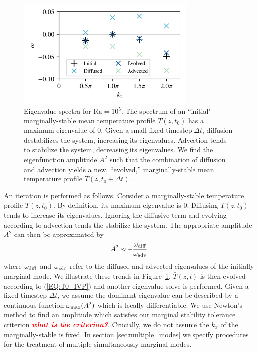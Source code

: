 \documentclass[reprint,amsmath,amssymb,aps]{revtex4-1}
\newcommand{\note}[1]{\noindent \textbf{\textit{\textcolor{Red}{#1}}}}
\newcommand\Ra{\mathrm{Ra}}
\newcommand{\eq}[1]{(\ref{#1})}
\begin{document}
\begin{figure}
    \includegraphics[width=3.4in]{EV_spectrum_ol.png}
    \caption{Eigenvalue spectra for $\Ra = 10^5$. The spectrum of an ``initial" marginally-stable mean temperature profile $\bar{T}(z, t_0)$ has a maximum eigenvalue of 0. 
    Given a small fixed timestep $\Delta t$, diffusion destabilizes the system, increasing its eigenvalues. 
    Advection tends to stabilize the system, decreasing its eigenvalues. 
    We find the eigenfunction amplitude $A^2$ such that the combination of diffusion and advection yields a new, ``evolved,'' marginally-stable mean temperature profile $\bar{T}(z, t_0 + \Delta t)$.}
    \label{fig:iteration_spectra} 
\end{figure}

An iteration is performed as follows.
Consider a marginally-stable temperature profile $\bar{T}(z, t_0)$.
By definition, its maximum eigenvalue is 0.
Diffusing $\bar{T}(z, t_0)$ tends to increase its eigenvalues.
Ignoring the diffusive term and evolving according to advection tends the stabilize the system.
The appropriate amplitude $A^2$ can then be approximated by
\begin{equation}
    A^2 \approx -\frac{\omega_{\rm{diff}}}{\omega_{\rm{adv}}}
\end{equation}
where $\omega_{\rm{diff}}$ and $\omega_{\rm{adv}}$ refer to the diffused and advected eigenvalues of the initially marginal mode.
We illustrate these trends in Figure~\ref{fig:iteration_spectra}. 
$\bar{T}(z, t)$ is then evolved according to \eq{EQ:T0_IVP} and another eigenvalue solve is performed. 
Given a fixed timestep $\Delta t$, we assume the dominant eigenvalue can be described by a continuous function $\omega_{\rm{max}} (A^2)$ which is locally differentiable. 
We use Newton's method to find an amplitude which satisfies our marginal stability tolerance criterion \note{what is the criterion?}.
Crucially, we do not assume the $k_x$ of the marginally-stable is fixed.
In section \ref{sec:multiple_modes} we specify procedures for the treatment of multiple simultaneously marginal modes.
\end{document}
